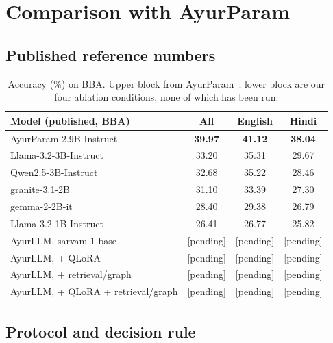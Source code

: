 \documentclass[10pt,twocolumn,letterpaper]{article}
\begin{document}
\section{Comparison with AyurParam}
\label{sec:ayurparam}

\subsection{Published reference numbers}

\begin{table}[t]
\centering
\small
\setlength{\tabcolsep}{4pt}
\begin{tabular}{@{}lccc@{}}
\toprule
\textbf{Model (published, BBA)} & \textbf{All} & \textbf{English} & \textbf{Hindi} \\
\midrule
AyurParam-2.9B-Instruct~\cite{ayurparam} & \textbf{39.97} & \textbf{41.12} & \textbf{38.04} \\
Llama-3.2-3B-Instruct                   & 33.20 & 35.31 & 29.67 \\
Qwen2.5-3B-Instruct                     & 32.68 & 35.22 & 28.46 \\
granite-3.1-2B                          & 31.10 & 33.39 & 27.30 \\
gemma-2-2B-it                           & 28.40 & 29.38 & 26.79 \\
Llama-3.2-1B-Instruct                   & 26.41 & 26.77 & 25.82 \\
\midrule
AyurLLM, sarvam-1 base                  & [pending] & [pending] & [pending] \\
AyurLLM, + QLoRA                        & [pending] & [pending] & [pending] \\
AyurLLM, + retrieval/graph              & [pending] & [pending] & [pending] \\
AyurLLM, + QLoRA + retrieval/graph      & [pending] & [pending] & [pending] \\
\bottomrule
\end{tabular}
\caption{Accuracy (\%) on BBA. Upper block from AyurParam~\cite{ayurparam}; lower
block are our four ablation conditions, none of which has been run.}
\label{tab:bba}
\end{table}

\subsection{Protocol and decision rule}
\end{document}
